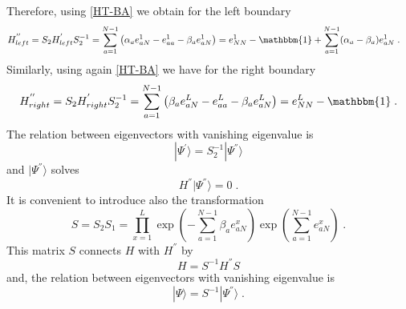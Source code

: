 \documentclass[10pt]{article}
\numberwithin{equation}{section}
\numberwithin{equation}{subsection}
\newcommand{\dt}{\;.}
\begin{document}
Therefore, using \eqref{HT-BA} we obtain for the left boundary 
\begin{equation}
	\begin{split}
		H_{left}^{''}&=S_{2}H_{left}^{'}S_{2}^{-1}
		=
		\sum_{a=1}^{N-1}\left(\alpha_{a}e_{aN}^{1}-e_{aa}^{1}-\beta_{a}e_{aN}^{1}\right)
		=
		e_{NN}^{1}-\mathbbm{1}+\sum_{a=1}^{N-1}(\alpha_{a}-\beta_{a})e_{aN}^{1}\dt
	\end{split}
\end{equation}
Similarly, using again \eqref{HT-BA} we have for the right boundary 
\begin{equation}
	\begin{split}
			H_{right}^{''}=S_{2}H_{right}^{'}S_{2}^{-1}
			=
			\sum_{a=1}^{N-1}\left(\beta_{a}e_{aN}^{L}-e_{aa}^{L}-\beta_{a}e_{aN}^{L}\right)=
			e_{NN}^{L}-\mathbbm{1}\dt
	\end{split}
\end{equation}
The relation between eigenvectors with vanishing eigenvalue is 
\begin{equation}\label{S2-Inverse}
	|\Psi^{'}\rangle = S_{2}^{-1}|\Psi^{''}\rangle
\end{equation}
and $|\Psi^{''}\rangle$ solves
\begin{equation}\label{steadyS-SECOND-def}
	H^{''}|\Psi^{''}\rangle=0\dt
\end{equation}
It is convenient to introduce also the transformation
\begin{equation}\label{similarity}
	S=S_{2}S_{1}=\prod_{x=1}^{L}\exp{\left(-\sum_{a=1}^{N-1}\beta_{a}e_{aN}^{x}\right)}\exp{\left(\sum_{a=1}^{N-1}e_{aN}^{x}\right)}\dt
\end{equation}
This matrix $S$ connects $H$ with $H^{''}$ by 
\begin{equation}
H=S^{-1}H^{''}S
\end{equation}
and, the relation between eigenvectors with vanishing eigenvalue is
\begin{equation}
	|\Psi\rangle=S^{-1}|\Psi^{''}\rangle\dt
\end{equation}
\end{document}
